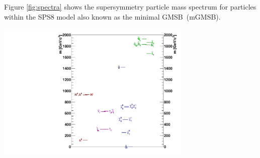 Figure \ref{fig:spectra} shows the supersymmetry particle mass spectrum for particles within the SPS8 model also known as the minimal GMSB~(mGMSB). 
\begin{center}
\centering
\includegraphics[height= 0.6\textwidth, width=0.7\textwidth]{THESISPLOTS/gmsb_Lambda180_CTau10000.pdf}  
\label{fig:spectra}
\end{center}

